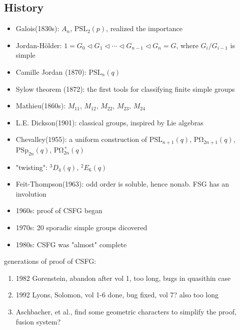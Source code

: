 \documentclass[a4,11pt]{article}
\def\PSL{\mathrm{PSL}}
\def\PSp{\mathrm{PSp}}
\def\PO{\mathrm{P\Omega}}
\def\PSL{\mathrm{PSL}}
\begin{document}
\subsection{History}
\begin{itemize}
	\item[] Galois(1830s): $A_n$, $\PSL_2(p)$, realized the importance
	\item[] Jordan-H\"older: $1=G_0\triangleleft G_1\triangleleft \cdots\triangleleft G_{n-1}\triangleleft G_n=G$, where $G_{i}/G_{i-1}$ is simple
	\item[] Camille Jordan (1870): $\PSL_n(q)$
	\item[] Sylow theorem (1872): the first tools for classifying finite simple groups
	\item[] Mathieu(1860s): $M_{11}$, $M_{12}$, $M_{22}$, $M_{23}$, $M_{24}$
	\item[] L.E. Dickson(1901): classical groups, inspired by Lie algebras
	\item[] Chevalley(1955): a uniform construction of $\PSL_{n+1}(q)$, $\PO_{2n+1}(q)$, $\PSp_{2n}(q)$, $\PO_{2n}^+(q)$
	\item[] "twisting": $^3D_4(q)$, $^2E_6(q)$
	\item[] Feit-Thompson(1963): odd order is soluble, hence nonab. FSG has an involution
	\item[] 1960s: proof of CSFG began
	\item[] 1970s: 20 sporadic simple groups dicovered
	\item[] 1980s: CSFG was "almost" complete
\end{itemize}

 generations of proof of CSFG:
\begin{enumerate}
	\item 1982 Gorenstein, abandon after vol 1, too long, bugs in quasithin case
	\item 1992 Lyons, Solomon, vol 1-6 done, bug fixed, vol 7? also too long 
	\item Aschbacher, et al., find some geometric characters to simplify the proof, fusion system?
\end{enumerate}

\newpage
\end{document}
